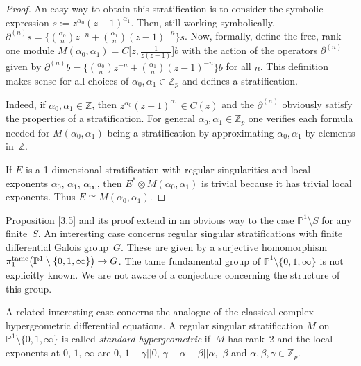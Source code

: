 \documentclass[pdftex]{sigma}
\numberwithin{equation}{section}
\begin{document}
\begin{proof} An easy way to obtain this stratification is to consider the symbolic expression $s:=z^{\alpha_0}(z-1)^{\alpha _1}$. Then, still working symbolically, $\partial^{(n)}s=\big\{{\alpha _0\choose n }z^{-n}+{\alpha_1\choose n}(z-1)^{-n} \big\}s$. Now, formally, define the free, rank one module $M(\alpha_0,\alpha _1)=C\big[z,\frac{1}{z(z-1)}\big]b$ with the action of the operators $\partial^{(n)}$ given by $\partial^{(n)}b=\big\{{\alpha _0\choose n }z^{-n}+{\alpha_1\choose n}(z-1)^{-n} \big\}b$ for all $n$. This definition makes sense for all choices of $\alpha _0,\alpha _1\in \mathbb{Z}_p$ and defines a stratification.

Indeed, if $\alpha_0, \alpha_1\in \mathbb{Z}$, then $z^{\alpha_0}(z-1)^{\alpha_1}\in C(z)$ and the $\partial^{(n)}$ obviously satisfy the properties of a stratification. For general $\alpha_0,\alpha _1\in \mathbb{Z}_p$ one verifies each formula needed for $M(\alpha _0,\alpha_1)$ being a stratification by approximating $\alpha _0,\alpha_1$ by elements in~$\mathbb{Z}$.

If $E$ is a 1-dimensional stratification with regular singularities and local exponents $\alpha_0$, $\alpha _1$, $\alpha_\infty$, then $E^*\otimes M(\alpha _0,\alpha _1)$ is trivial because it has trivial local exponents. Thus $E\cong M(\alpha_0,\alpha_1)$. \end{proof}

Proposition \ref{3.5} and its proof extend in an obvious way to the case $\mathbb{P}^1\setminus S$ for any finite~$S$. An interesting case concerns regular singular stratifications with finite differential Galois group~$G$. These are given by a surjective homomorphism $\pi_1^{\rm tame}\big(\mathbb{P}^1\setminus \{0,1,\infty \}\big)\rightarrow G$. The tame fundamental group of $\mathbb{P}^1\setminus \{0,1,\infty \}$ is not explicitly known. We are not aware of a conjecture concerning the structure of this group.

A related interesting case concerns the analogue of the classical complex hypergeometric differential equations. A regular singular stratification $M$ on $\mathbb{P}^1\setminus \{0,1,\infty \}$ is called {\it standard hy\-per\-geometric} if~$M$ has rank~2 and the local exponents at $0$, $1$, $\infty$ are $ 0$, $1-\gamma || 0$, $\gamma -\alpha -\beta || \alpha$,~$\beta $ and $\alpha , \beta , \gamma \in \mathbb{Z}_p$.
\end{document}
